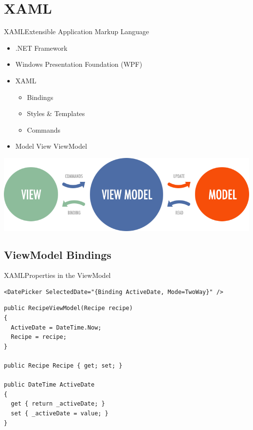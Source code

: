 \section{XAML} 
\begin{frame}[fragile]{XAML}{Extensible Application Markup Language}
  \begin{itemize}
    \item .NET Framework
    \item Windows Presentation Foundation (WPF)
    \item XAML
    \begin{itemize}
      \item Bindings
      \item Styles \& Templates
      \item Commands
    \end{itemize}
    \item Model View ViewModel
  \end{itemize}


  \includegraphics[width=\textwidth]{graphics/mvvm.png}

\end{frame}

\subsection{ViewModel Bindings} 
\begin{frame}[fragile]{XAML}{Properties in the ViewModel}

\begin{lstlisting}
<DatePicker SelectedDate="{Binding ActiveDate, Mode=TwoWay}" />
\end{lstlisting}

\begin{lstlisting}
public RecipeViewModel(Recipe recipe)
{
  ActiveDate = DateTime.Now;
  Recipe = recipe;
}

public Recipe Recipe { get; set; }

public DateTime ActiveDate
{
  get { return _activeDate; }
  set { _activeDate = value; }
}
\end{lstlisting}

\end{frame}

